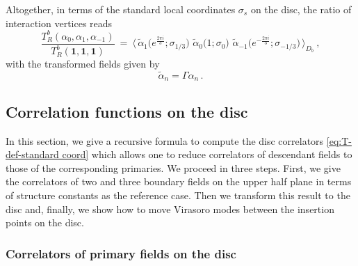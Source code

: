 \documentclass[11pt,a4paper]{article}
\numberwithin{equation}{section}
\newcommand{\one}{\mathbf{1}} %
\begin{document}
\noindent 
Altogether, in terms of the standard local coordinates $\sigma_s$ on the disc, the ratio of interaction vertices reads
\begin{equation}\label{eq:T-def-standard coord}
\frac{T_R^b(\alpha_0,\alpha_1,\alpha_{-1})}{T_R^b(\one,\one,\one)}
~=~ 
\Big\langle 
\,\tilde\alpha_1\big(e^{\frac{2 \pi i}3};\sigma_{1/3}\big)
\,\,\tilde\alpha_0\big(1;\sigma_0\big)
\,\,\tilde\alpha_{-1}\big(e^{-\frac{2 \pi i}3};\sigma_{-1/3}\big)
\,\Big\rangle_{\!D_b} ~,
\end{equation}
%
with the transformed fields given by
%
\begin{equation}\label{eq:tilde-alpha}
\tilde\alpha_n = \Gamma \alpha_n\,.
\end{equation}

\subsection{Correlation functions on the disc}\label{sec:disc-recursion-and-vertex}

In this section, we give a recursive formula to compute the disc correlators \eqref{eq:T-def-standard coord} which allows one to reduce correlators of descendant fields to those of the corresponding primaries. We proceed in three steps. First, we give the correlators of two and three boundary fields on the upper half plane in terms of structure constants as the reference case. Then we transform this result to the disc and, finally, we show how to move Virasoro modes between the insertion points on the disc.

\subsubsection{Correlators of primary fields on the disc}\label{sec:primary-corr-disc}
\end{document}
